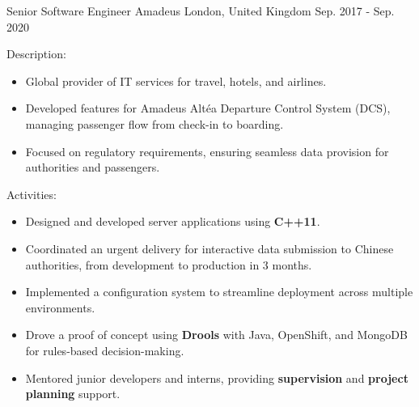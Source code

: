 \begin{cventries}
    \cventry
    {Senior Software Engineer} %
    {Amadeus} %
    {London,  United Kingdom} %
    {Sep. 2017 - Sep. 2020} %
    {
      \begin{cvitems}
        \item[]{Description:
          \begin{itemize}
              \item {Global provider of IT services for travel, hotels, and airlines.}
              \item {Developed features for Amadeus Altéa Departure Control System (DCS), managing passenger flow from check-in to boarding.}
              \item {Focused on regulatory requirements, ensuring seamless data provision for authorities and passengers.}
          \end{itemize}}
        \item[]{Activities:
          \begin{itemize}
            \item {Designed and developed server applications using \textbf{C++11}.}
            \item {Coordinated an urgent delivery for interactive data submission to Chinese authorities, from development to production in 3 months.}
            \item {Implemented a configuration system to streamline deployment across multiple environments.}
            \item {Drove a proof of concept using \textbf{Drools} with Java, OpenShift, and MongoDB for rules-based decision-making.}
            \item {Mentored junior developers and interns, providing \textbf{supervision} and \textbf{project planning} support.}
          \end{itemize}}
      \end{cvitems}
    }


\end{cventries}
